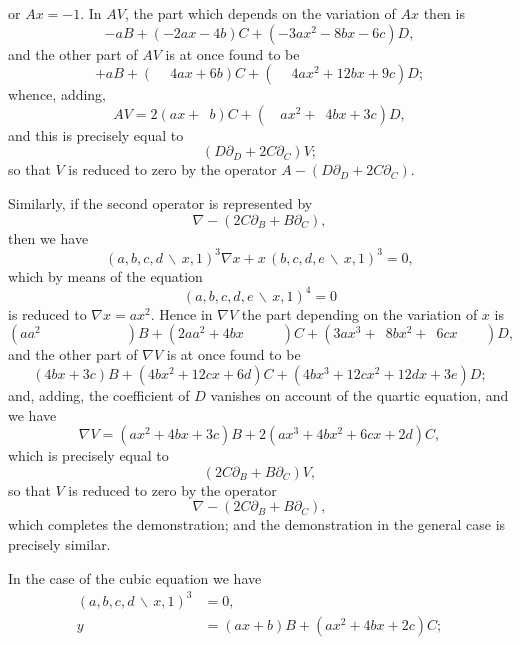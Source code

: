 \documentclass[11pt,a4paper]{article}
\theoremstyle{definition}
\begin{document}
\newpage

or $Ax = -1$. In $AV$, the part which depends on the variation of $Ax$ then is
\[-aB + (-2ax-4b)C + (-3ax^{2}-8bx-6c)D,\]
and the other part of $AV$ is at once found to be
\[+aB + (\phantom{-}4ax+6b)C + (\phantom{-}4ax^{2}+12bx+9c)D;\]
whence, adding,
\[AV = 2(ax+\phantom{1}b)C + (\phantom{1\;\,}ax^{2}+\phantom{1}4bx+3c)D,\]
and this is precisely equal to
\[(D\partial_{D} + 2C\partial_{C})V;\]
so that $V$ is reduced to zero by the operator $A - (D\partial_{D} + 2C\partial_{C})$.

Similarly, if the second operator is represented by
\[\nabla - (2C\partial_{B} + B\partial_{C}),\]
then we have
\[(a,b,c,d\,\backslash\!\!\,x,1)^{3}\nabla x + x\,(b,c,d,e\,\backslash\!\!\,x,1)^{3} = 0,\]
which by means of the equation
\[(a,b,c,d,e\,\backslash\!\!\,x,1)^{4} = 0\]
is reduced to $\nabla x = ax^{2}$. Hence in $\nabla V$ the part depending on the variation
of $x$ is
\[(aa^{2}\phantom{+0000x+000})B + (2aa^{2}+4bx\phantom{+000\;\,})C + (3ax^{3}+\phantom{1}8bx^{2}+\phantom{1}6cx\phantom{+0d\,})D,\]
and the other part of $\nabla V$ is at once found to be
\[(4bx+3c)B + (4bx^{2}+12cx+6d)C + (4bx^{3}+12cx^{2}+12dx+3e)D;\]
and, adding, the coefficient of $D$ vanishes on account of the quartic equation, and we
have
\[\nabla V = (ax^{2}+4bx+3c)B + 2(ax^{3}+4bx^{2}+6cx+2d)C,\]
which is precisely equal to
\[(2C\partial_{B} + B\partial_{C})V,\]
so that $V$ is reduced to zero by the operator
\[\nabla - (2C\partial_{B} + B\partial_{C}),\]
which completes the demonstration; and the demonstration in the general case is
precisely similar.

In the case of the cubic equation we have
\begin{align*}
(a,b,c,d\,\backslash\!\!\,x,1)^{3} &= 0,\\
y &= (ax+b)B + (ax^{2}+4bx+2c)C;
\end{align*}
\vspace{0.5em}

\newpage
\end{document}
